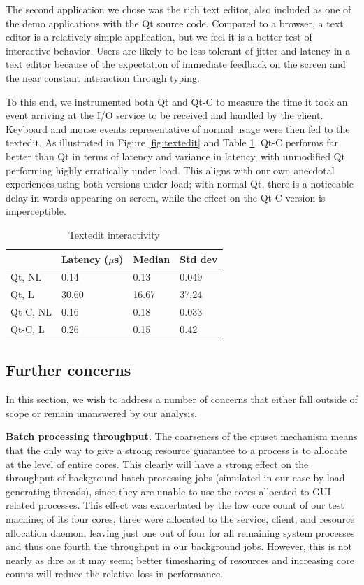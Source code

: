 \documentclass[letterpaper,twocolumn,11pt]{article}
\begin{document}
The second application we chose was the rich text editor, also included as one of the demo applications with the Qt source code. Compared to a browser, a text editor is a relatively simple application, but we feel it is a better test of interactive behavior. Users are likely to be less tolerant of jitter and latency in a text editor because of the expectation of immediate feedback on the screen and the near constant interaction through typing. 

To this end, we instrumented both Qt and Qt-C to measure the time it took an event arriving at the I/O service to be received and handled by the client. Keyboard and mouse events representative of normal usage were then fed to the textedit. As illustrated in Figure \ref{fig:textedit} and Table \ref{tab:textedit_table}, Qt-C performs far better than Qt in terms of latency and variance in latency, with unmodified Qt performing highly erratically under load. This aligns with our own anecdotal experiences using both versions under load; with normal Qt, there is a noticeable delay in words appearing on screen, while the effect on the Qt-C version is imperceptible.

\begin{table}[htp]
\centering
\begin{tabular}{|l | l | l | l |}
\hline
	&Latency ($\mu$s)	&Median	&Std dev\\ \hline
Qt, NL	&0.14	&0.13	&0.049\\
Qt, L	&30.60	&16.67	&37.24\\
Qt-C, NL	&0.16	&0.18	&0.033\\
Qt-C, L	&0.26	&0.15	&0.42\\
\hline
\end{tabular}
\caption{Textedit interactivity}
\label{tab:textedit_table}
\end{table}

\subsection{Further concerns}

In this section, we wish to address a number of concerns that either fall outside of scope or remain unanswered by our analysis.

\textbf{Batch processing throughput.} The coarseness of the cpuset mechanism means that the only way to give a strong resource guarantee to a process is to allocate at the level of entire cores. This clearly will have a strong effect on the throughput of background batch processing jobs (simulated in our case by load generating threads), since they are unable to use the cores allocated to GUI related processes. This effect was exacerbated by the low core count of our test machine; of its four cores, three were allocated to the service, client, and resource allocation daemon, leaving just one out of four for all remaining system processes and thus one fourth the throughput in our background jobs. However, this is not nearly as dire as it may seem; better timesharing of resources and increasing core counts will reduce the relative loss in performance.
\end{document}
